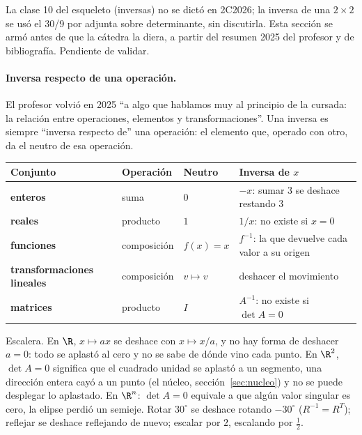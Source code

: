 \begin{atencion}[Anticipado]
La clase 10 del esqueleto (inversas) no se dictó en 2C2026; la inversa de una \(2\times2\)
se usó el 30/9 por adjunta sobre determinante, sin discutirla. Esta sección se armó antes
de que la cátedra la diera, a partir del resumen 2025 del profesor y de bibliografía.
Pendiente de validar.
\end{atencion}

\paragraph{Inversa respecto de una operación.} El profesor volvió en 2025 ``a algo que
hablamos muy al principio de la cursada: la relación entre operaciones, elementos y
transformaciones''. Una inversa es siempre ``inversa respecto de'' una operación: el
elemento que, operado con otro, da el neutro de esa operación.

{\small
\begin{center}
\begin{tabularx}{.92\textwidth}{>{\bfseries}l l l Y}
\toprule
Conjunto & Operación & Neutro & Inversa de \(x\)\\
\midrule
enteros & suma & \(0\) & \(-x\): sumar \(3\) se deshace restando \(3\)\\
reales & producto & \(1\) & \(1/x\): no existe si \(x=0\)\\
funciones & composición & \(f(x)=x\) & \(f^{-1}\): la que devuelve cada valor a su origen\\
transformaciones lineales & composición & \(v\mapsto v\) & deshacer el movimiento\\
matrices & producto & \(I\) & \(A^{-1}\): no existe si \(\det A=0\)\\
\bottomrule
\end{tabularx}
\end{center}
}

Escalera. En \(\R\), \(x\mapsto ax\) se deshace con \(x\mapsto x/a\), y no hay forma de
deshacer \(a=0\): todo se aplastó al cero y no se sabe de dónde vino cada punto. En
\(\R^2\), \(\det A=0\) significa que el cuadrado unidad se aplastó a un segmento, una
dirección entera cayó a un punto (el núcleo, sección~\ref{sec:nucleo}) y no se puede
desplegar lo aplastado. En \(\R^n\): \(\det A=0\) equivale a que algún valor singular es
cero, la elipse perdió un semieje. Rotar \(30^\circ\) se deshace rotando \(-30^\circ\)
(\(R^{-1}=R^T\)); reflejar se deshace reflejando de nuevo; escalar por \(2\), escalando
por \(\tfrac12\).

